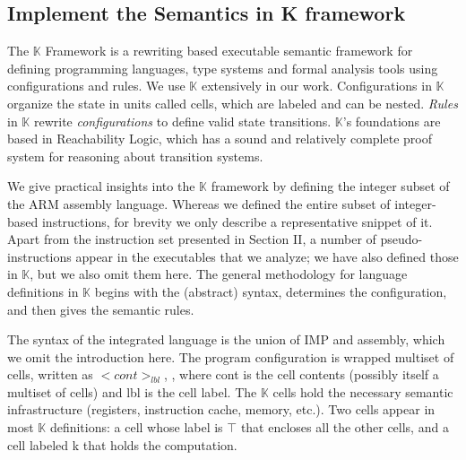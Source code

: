\documentclass[conference]{IEEEtran}
\begin{document}
\subsection{Implement the Semantics in K framework}
The $\mathbb{K}$ Framework is a rewriting based executable semantic framework for defining programming languages, type systems and formal analysis tools using configurations and rules.  We use $\mathbb{K}$ extensively in our work.
Configurations in $\mathbb{K}$ organize the state in units called cells, which are labeled and can be nested. \emph{Rules} in $\mathbb{K}$ rewrite \emph{configurations} to define valid state transitions. $\mathbb{K}$'s foundations are based in Reachability Logic, which has a sound and relatively complete proof system for
reasoning about transition systems.
\par We give practical insights into the $\mathbb{K}$ framework by defining the integer subset of the ARM assembly language.
 Whereas we defined the entire subset of integer-based instructions, for brevity we only describe a representative snippet of it. Apart from the instruction set presented in Section II, a number of pseudo-instructions
appear in the executables that we analyze; we have also defined those in $\mathbb{K}$, but we also omit them here. The general methodology for language definitions in $\mathbb{K}$ begins with the (abstract) syntax, determines the configuration, and then gives the semantic rules.
\par The syntax of the integrated language is the union of IMP and assembly, which we omit the introduction here. The program configuration is wrapped multiset of cells, written as $<cont>_{lbl}$, , where cont is
the cell contents (possibly itself a multiset of cells) and lbl is the cell label. The $\mathbb{K}$ cells hold the necessary semantic infrastructure (registers, instruction cache, memory, etc.). Two cells appear in most $\mathbb{K}$ definitions: a cell whose label is $\top$ that encloses all the other cells, and a cell labeled k that holds the computation.
\end{document}
